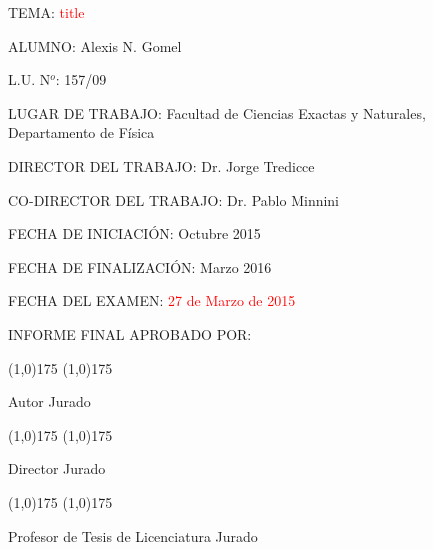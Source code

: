 





%
\thispagestyle{empty}

TEMA: \textcolor{red}{title}
    

\vspace{12pt}

ALUMNO: Alexis N. Gomel

\vspace{12pt}

L.U. N$^o$: 157/09

\vspace{12pt}

LUGAR DE TRABAJO: Facultad de Ciencias Exactas y Naturales, Departamento de Física

\vspace{12pt}

DIRECTOR DEL TRABAJO: Dr. Jorge Tredicce

CO-DIRECTOR DEL TRABAJO: Dr. Pablo Minnini


\vspace{12pt}

FECHA DE INICIACIÓN: Octubre 2015

\vspace{12pt}

FECHA DE FINALIZACIÓN: Marzo 2016

\vspace{12pt}

FECHA DEL EXAMEN: \textcolor{red}{27 de Marzo de 2015} 

\vspace{12pt}

INFORME FINAL APROBADO POR:

\vspace{3cm}

\line(1,0){175} \hspace{60pt} \line(1,0){175}

Autor \hspace{205pt} Jurado

\vspace{2cm}

\line(1,0){175} \hspace{60pt} \line(1,0){175}

Director \hspace{195pt} Jurado

\vspace{2cm}

\line(1,0){175} \hspace{60pt} \line(1,0){175}

Profesor de Tesis de Licenciatura \hspace{75pt} Jurado

%
